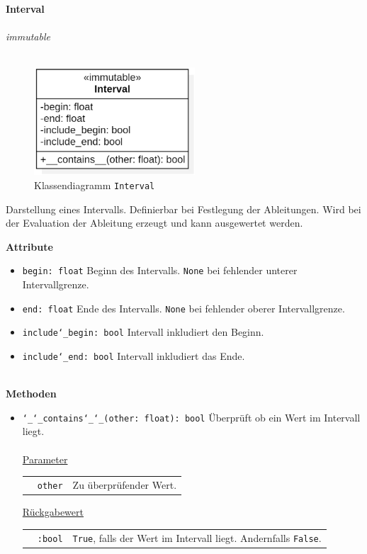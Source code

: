\documentclass{article}
\begin{document}
\newpage
\textbf{\large{Interval}}\\\\
\textit{\flqq{}immutable\frqq}\normalsize\\\\
\begin{figure}[H]%
    \centering
    \includegraphics[width=6cm]{entwurf/Entwurf_dokument/img/cls/model/Interval.png}
    \caption{Klassendiagramm \texttt{Interval}}
\end{figure}

Darstellung eines Intervalls. Definierbar bei Festlegung der Ableitungen. Wird bei der Evaluation der Ableitung erzeugt und kann ausgewertet werden.
\newline \newline

\textbf{{Attribute}}
\begin{itemize}
\item \texttt{begin: float} \newline Beginn des Intervalls. \texttt{None} bei fehlender unterer Intervallgrenze. 
\item \texttt{end: float} \newline Ende des Intervalls. \texttt{None} bei fehlender oberer Intervallgrenze. 
\item \texttt{include\char`_begin: bool} \newline Intervall inkludiert den Beginn.
\item \texttt{include\char`_end: bool} \newline Intervall inkludiert das Ende.
\\\\
\end{itemize}

\textbf{{Methoden}}
\begin{itemize}
\item \texttt{\char`_\char`_contains\char`_\char`_(other: float): bool} \newline Überprüft ob ein Wert im Intervall liegt.
\\\\
\underline{{Parameter}}

\begin{tabular}{lll}
 & \texttt{other} & Zu überprüfender Wert. \\
\end{tabular}

\underline{{Rückgabewert}}

\begin{tabular}{lll}
 & \texttt{:bool} & \texttt{True}, falls der Wert im Intervall liegt. Andernfalls \texttt{False}. \\
\end{tabular}
\end{itemize}
\end{document}
